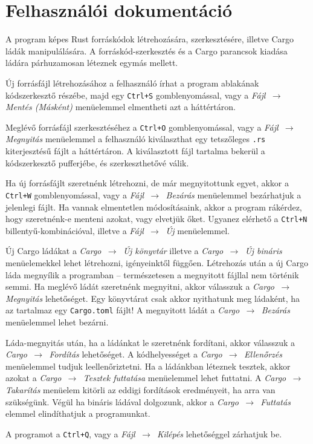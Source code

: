 \chapter*{Felhasználói dokumentáció}

A program képes Rust forráskódok létrehozására, szerkesztésére, illetve Cargo ládák
manipulálására.
A forráskód-szerkesztés és a Cargo parancsok kiadása ládára párhuzamosan léteznek egymás mellett.

Új forrásfájl létrehozásához a felhasználó írhat a program ablakának kódszerkesztő részébe,
majd egy \texttt{Ctrl+S} gomblenyomással, vagy a \textit{Fájl $\,\to\,$ Mentés (Másként)} menüelemmel
elmentheti azt a háttértáron.

Meglévő forrásfájl szerkesztéséhez a \texttt{Ctrl+O} gomblenyomással, vagy a \textit{Fájl $\,\to\,$ Megnyitás}
menüelemmel a felhasználó kiválaszthat egy tetszőleges \texttt{.rs} kiterjesztésű fájlt a háttértáron.
A kiválasztott fájl tartalma bekerül a kódszerkesztő pufferjébe, és szerkeszthetővé válik.

Ha új forrásfájlt szeretnénk létrehozni, de már megnyitottunk egyet, akkor a \texttt{Ctrl+W} gomblenyomással, 
vagy a \textit{Fájl $\,\to\,$ Bezárás} menüelemmel bezárhatjuk a jelenlegi fájlt.
Ha vannak elmentetlen módosításaink, akkor a program rákérdez, hogy szeretnénk-e menteni azokat,
vagy elvetjük őket.
Ugyanez elérhető a \texttt{Ctrl+N} billentyű-kombinációval, illetve a \textit{Fájl $\,\to\,$ Új} menüelemmel.

Új Cargo ládákat a \textit{Cargo $\,\to\,$ Új könyvtár} illetve a \textit{Cargo $\,\to\,$ Új bináris}
menüelemekkel lehet létrehozni, igényeinktől függően.
Létrehozás után a új Cargo láda megnyílik a programban -- természetesen a megnyitott fájllal nem történik semmi.
Ha meglévő ládát szeretnénk megnyitni, akkor válasszuk a \textit{Cargo $\,\to\,$ Megnyitás} lehetőséget.
Egy könyvtárat csak akkor nyithatunk meg ládaként, ha az tartalmaz egy \texttt{Cargo.toml} fájlt!
A megnyitott ládát a \textit{Cargo $\,\to\,$ Bezárás} menüelemmel lehet bezárni.

Láda-megnyitás után, ha a ládánkat le szeretnénk fordítani, akkor válasszuk a \textit{Cargo $\,\to\,$ Fordítás} lehetőséget.
A kódhelyességet a \textit{Cargo $\,\to\,$ Ellenőrzés} menüelemmel tudjuk leellenőriztetni.
Ha a ládánkban léteznek tesztek, akkor azokat a \textit{Cargo $\,\to\,$ Tesztek futtatása} menüelemmel
lehet futtatni.
A \textit{Cargo $\,\to\,$ Takarítás} menüelem kitörli az eddigi fordítások eredményeit, ha arra van szükségünk.
Végül ha bináris ládával dolgozunk, akkor a \textit{Cargo $\,\to\,$ Futtatás} elemmel elindíthatjuk a programunkat.

A programot a \texttt{Ctrl+Q}, vagy a \textit{Fájl $\,\to\,$ Kilépés} lehetőséggel zárhatjuk be.